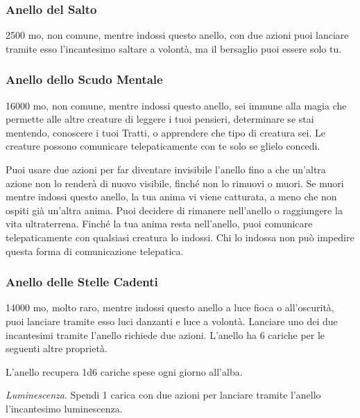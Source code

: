 \begin{multicols}{2}
	\medskip

	\subsubsection*{Anello del Salto}
	2500 mo, non comune, mentre indossi questo anello, con due azioni puoi lanciare tramite esso l'incantesimo saltare a volontà, ma il bersaglio puoi essere solo tu.

	\subsubsection*{Anello dello Scudo Mentale}
	16000 mo, non comune, mentre indossi questo anello, sei immune alla magia che permette alle altre creature di leggere i tuoi pensieri, determinare se stai mentendo, conoscere i tuoi Tratti, o apprendere che tipo di creatura sei. Le creature possono comunicare telepaticamente con te solo se glielo concedi.

	Puoi usare due azioni per far diventare invisibile l'anello fino a che un'altra azione non lo renderà di nuovo visibile, finché non lo rimuovi o muori. Se muori mentre indossi questo anello, la tua anima vi viene catturata, a meno che non ospiti già un'altra anima. Puoi decidere di rimanere nell'anello o raggiungere la vita ultraterrena. Finché la tua anima resta nell'anello, puoi comunicare telepaticamente con qualsiasi creatura lo indossi. Chi lo indossa non può impedire questa forma di comunicazione telepatica.

	\subsubsection*{Anello delle Stelle Cadenti}
	14000 mo, molto raro, mentre indossi questo anello a luce fioca o all'oscurità, puoi lanciare tramite esso luci danzanti e luce a volontà. Lanciare uno dei due incantesimi tramite l'anello richiede due azioni. L'anello ha 6 cariche per le seguenti altre proprietà.

	L'anello recupera 1d6 cariche spese ogni giorno all'alba.

	\textit{Luminescenza}. Spendi 1 carica con due azioni per lanciare tramite l'anello l'incantesimo luminescenza.


\end{multicols}
